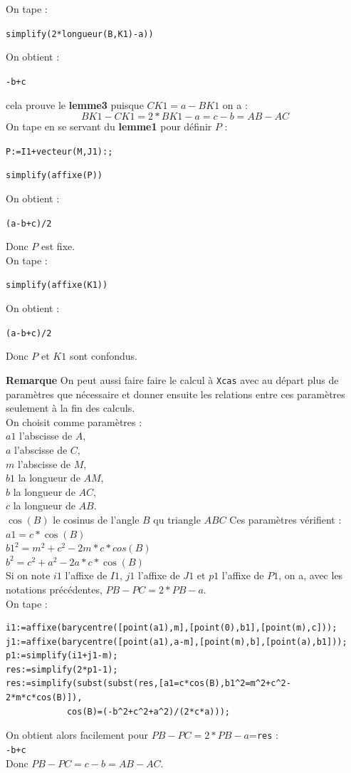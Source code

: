 \documentclass[a4paper,11pt]{book}
\begin{document}
On tape :
\begin{center}{\tt simplify(2*longueur(B,K1)-a))}\end{center}
On obtient :
\begin{center}{\tt -b+c}\end{center}
cela prouve le {\bf lemme3} puisque $CK1=a-BK1$ on a :
$$BK1-CK1=2*BK1-a=c-b=AB-AC$$
On tape en se servant du {\bf lemme1} pour d\'efinir $P$ :
\begin{center}{\tt P:=I1+vecteur(M,J1):;}\end{center}
\begin{center}{\tt simplify(affixe(P))}\end{center}
On obtient :
\begin{center}{\tt (a-b+c)/2}\end{center}
Donc $P$ est fixe.\\
On tape :
\begin{center}{\tt simplify(affixe(K1))}\end{center}
On obtient :
\begin{center}{\tt  (a-b+c)/2}\end{center}
Donc $P$ et $K1$ sont confondus.

{\bf Remarque}
On peut aussi faire faire le calcul \`a {\tt Xcas} avec au d\'epart plus de 
param\`etres que n\'ecessaire et donner ensuite les relations entre ces 
param\`etres seulement \`a la fin des calculs.\\
On choisit comme param\`etres :\\
$a1$ l'abscisse de $A$,\\
$a$ l'abscisse de $C$,\\
$m$ l'abscisse de $M$,\\
$b1$ la longueur de $AM$,\\
$b$ la longueur de $AC$,\\
$c$ la longueur de $AB$.\\
$\cos(B)$ le cosinus de l'angle $B$ qu triangle $ABC$
Ces param\`etres v\'erifient :\\
$a1=c*\cos(B)$\\
$b1^2=m^2+c^2-2m*c*cos(B)$\\
$b^2=c^2+a^2-2a*c*\cos(B)$\\
Si on note $i1$ l'affixe de $I1$, $j1$ l'affixe de $J1$ et $p1$ l'affixe de 
$P1$, on a, avec les notations pr\'ec\'edentes, $PB-PC=2*PB-a$.\\
On tape :
\begin{verbatim}
i1:=affixe(barycentre([point(a1),m],[point(0),b1],[point(m),c]));
j1:=affixe(barycentre([point(a1),a-m],[point(m),b],[point(a),b1]));
p1:=simplify(i1+j1-m);
res:=simplify(2*p1-1);
res:=simplify(subst(subst(res,[a1=c*cos(B),b1^2=m^2+c^2-2*m*c*cos(B)]),
            cos(B)=(-b^2+c^2+a^2)/(2*c*a)));
\end{verbatim}
On obtient alors facilement pour $PB-PC=2*PB-a$={\tt res} :\\
{\tt -b+c}\\
Donc  $PB-PC=c-b=AB-AC$.
\end{document}
